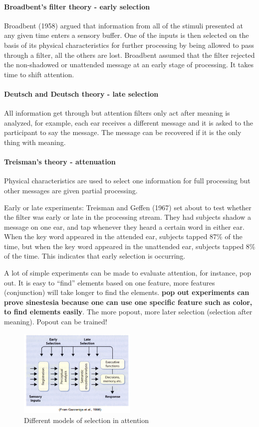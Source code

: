 \documentclass[12pt,article,oneside,a4paper]{memoir}
\begin{document}
\paragraph{Broadbent's filter theory - early selection}
Broadbent (1958) argued that information from all of the stimuli presented at
any given time enters a sensory buffer.  One of the inputs is then selected on
the basis of its physical characteristics for further processing by being allowed
to pass through a filter, all the others are lost.  Broadbent assumed that the
filter rejected the non-shadowed or unattended message at an early stage of
processing. It takes time to shift attention.

\paragraph{Deutsch and Deutsch theory - late selection}
All information get through but attention filters only act after meaning is
analyzed, for example, each ear receives a different message and it is asked to
the participant to say the message. The message can be recovered if it is the
only thing with meaning.

\paragraph{Treisman's theory - attenuation}
Physical characteristics are used to select one information for full processing
but other messages are given partial processing. 

Early or late experiments: Treisman and Geffen (1967) set about to test whether
the filter was early or late in the processing stream. They had subjects shadow
a message on one ear, and tap whenever they heard a certain word in either ear.
When the key word appeared in the attended ear, subjects tapped 87\% of the time,
but when the key word appeared in the unattended ear, subjects tapped 8\% of the
time. This indicates that early selection is occurring.

A lot of simple experiments can be made to evaluate attention, for instance,
pop out. It is easy to ``find'' elements based on one feature, more features
(conjunction) will take longer to find the elements. \textbf{pop out experiments
can prove sinestesia because one can use one specific feature such as color, to
find elements easily}. The more popout, more later selection (selection after
meaning). Popout can be trained!

\begin{figure}[h]
  \centering
  \includegraphics[width=0.5\textwidth]{imgs/early-late-selection.png}
  \caption{Different models of selection in attention}
  \label{fig:early-late-selection}
\end{figure}
\end{document}
